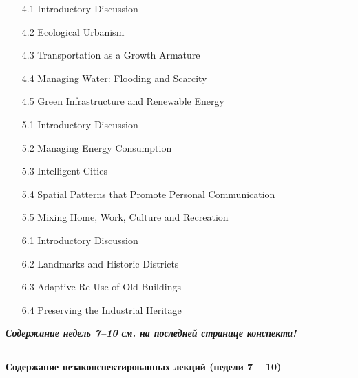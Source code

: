 \documentclass[a4paper]{article}
\begin{document}
{{\begin{description}
\begin{itemize}
\item[4.1] Introductory Discussion
\item[4.2] Ecological Urbanism
\item[4.3] Transportation as a Growth Armature
\item[4.4] Managing Water: Flooding and Scarcity
\item[4.5] Green Infrastructure and Renewable Energy
\end{itemize}
\item[Week 5]\hspace*{1cm}
\begin{itemize}
\item[5.1] Introductory Discussion
\item[5.2] Managing Energy Consumption
\item[5.3] Intelligent Cities
\item[5.4] Spatial Patterns that Promote Personal Communication
\item[5.5] Mixing Home, Work, Culture and Recreation
\end{itemize}
\item[Week 6]\hspace*{1cm}
\begin{itemize}
\item[6.1] Introductory Discussion
\item[6.2] Landmarks and Historic Districts
\item[6.3] Adaptive Re-Use of Old Buildings
\item[6.4] Preserving the Industrial Heritage
\end{itemize}
\end{description}}}
\centerline{\sl \textbf{Содержание недель 7--10 см. на последней странице конспекта!}}
\hrule
\newpage

\centerline{\textbf{Содержание незаконспектированных лекций (недели 7 -- 10)}}
\medskip
\end{document}
